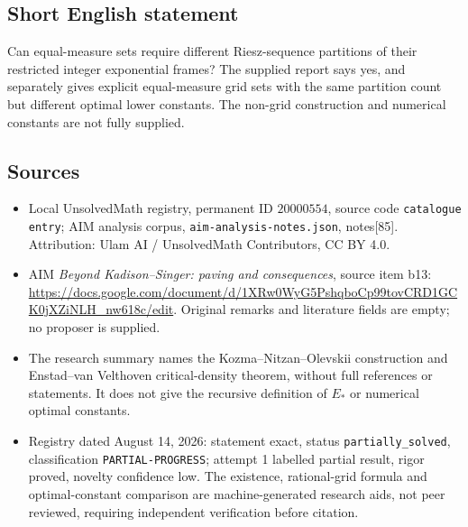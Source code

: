 \documentclass[11pt]{article}
\begin{document}
\subsection{Short English statement}
Can equal-measure sets require different Riesz-sequence partitions of their restricted integer exponential frames? The supplied report says yes, and separately gives explicit equal-measure grid sets with the same partition count but different optimal lower constants. The non-grid construction and numerical constants are not fully supplied.
\subsection{Sources}
\begin{itemize}
\item Local UnsolvedMath registry, permanent ID \(20000554\), source code \texttt{catalogue entry}; AIM analysis corpus, \texttt{aim-analysis-notes.json}, notes[85]. Attribution: Ulam AI / UnsolvedMath Contributors, CC BY 4.0.
\item AIM \emph{Beyond Kadison--Singer: paving and consequences}, source item b13: \url{https://docs.google.com/document/d/1XRw0WyG5PshqboCp99tovCRD1GCK0jXZiNLH_nw618c/edit}. Original remarks and literature fields are empty; no proposer is supplied.
\item The research summary names the Kozma--Nitzan--Olevskii construction and Enstad--van Velthoven critical-density theorem, without full references or statements. It does not give the recursive definition of \(E_*\) or numerical optimal constants.
\item Registry dated August 14, 2026: statement exact, status \texttt{partially\_solved}, classification \texttt{PARTIAL-PROGRESS}; attempt 1 labelled partial result, rigor proved, novelty confidence low. The existence, rational-grid formula and optimal-constant comparison are machine-generated research aids, not peer reviewed, requiring independent verification before citation.
\end{itemize}
\end{document}

